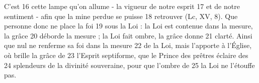 C'est	 
16	 	cette lampe qu'on allume - la vigueur de notre esprit	 
17	 	et de notre sentiment - afin que la mine perdue se puisse	 
18	 	retrouver (Lc, XV, 8). Que personne donc ne place la foi	 
19	 	sous la Loi : la Loi est contenue dans la mesure, la grâce	 
20	 	déborde la mesure ; la Loi fait ombre, la grâce donne	 
21	 	clarté. Ainsi que nul ne renferme sa foi dans la mesure	 
22	 	de la Loi, mais l'apporte à l'Église, où brille la grâce de	 
23	 	l'Esprit septiforme, que le Prince des prêtres éclaire des	 
24	 	splendeurs de la divinité souveraine, pour que l'ombre de	 
25	 	la Loi ne l'étouffe pas.